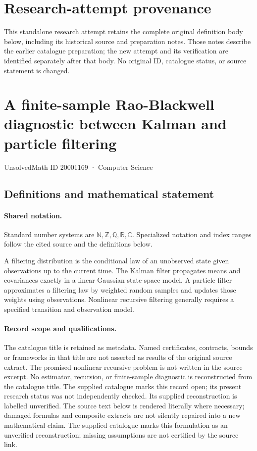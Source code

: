 \documentclass[11pt]{article}
\begin{document}
\section*{Research-attempt provenance}
This standalone research attempt retains the complete original definition body below,
including its historical source and preparation notes. Those notes describe the
earlier catalogue preparation; the new attempt and its verification are identified
separately after that body. No original ID, catalogue status, or source statement is changed.

\section{A finite-sample Rao-Blackwell diagnostic between Kalman and particle filtering}\label{20001169}
{\small UnsolvedMath ID 20001169 · Computer Science}
\subsection{Definitions and mathematical statement}

\paragraph{Shared notation.}Standard number systems are $\mathbb N,\mathbb Z,\mathbb Q,\mathbb R,\mathbb C$. Specialized notation and index ranges follow the cited source and the definitions below.


A filtering distribution is the conditional law of an unobserved state given observations up to the current time. The Kalman filter propagates means and covariances exactly in a linear Gaussian state-space model. A particle filter approximates a filtering law by weighted random samples and updates those weights using observations. Nonlinear recursive filtering generally requires a specified transition and observation model.
\paragraph{Record scope and qualifications.}
The catalogue title is retained as metadata. Named certificates, contracts, bounds or frameworks in that title are not asserted as results of the original source extract.
The promised nonlinear recursive problem is not written in the source excerpt. No estimator, recursion, or finite-sample diagnostic is reconstructed from the catalogue title. The supplied catalogue marks this record open; its present research status was not independently checked. Its supplied reconstruction is labelled unverified.
The source text below is rendered literally where necessary; damaged formulas and composite extracts are not silently repaired into a new mathematical claim.
The supplied catalogue marks this formulation as an unverified reconstruction; missing assumptions are not certified by the source link.
\end{document}
